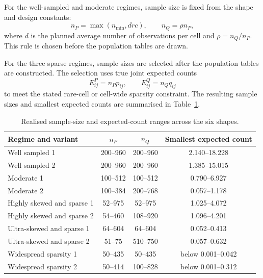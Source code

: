 For the well-sampled and moderate regimes, sample size is fixed from the shape
and design constants:
\begin{equation}
  n_P=\max(n_{\min},drc),
  \qquad
  n_Q=\rho n_P,
  \label{eq:fixed-density-n}
\end{equation}
where \(d\) is the planned average number of observations per cell and
\(\rho=n_Q/n_P\). This rule is chosen before the population tables are drawn.

For the three sparse regimes, sample sizes are selected after the population
tables are constructed. The selection uses true joint expected counts
\begin{equation}
  E^{P}_{ij}=n_Pp_{ij},
  \qquad
  E^{Q}_{ij}=n_Qq_{ij}
  \label{eq:true-expected-counts}
\end{equation}
to meet the stated rare-cell or cell-wide sparsity constraint. The resulting
sample sizes and smallest expected counts are summarised in
Table~\ref{tab:realized-designs}.

\begin{table}[htbp]
\centering
\caption{Realised sample-size and expected-count ranges across the six shapes.}
\label{tab:realized-designs}
\small
\begin{tabularx}{\textwidth}{@{}Xccc@{}}
\toprule
Regime and variant & \(n_P\) & \(n_Q\) & Smallest expected count \\
\midrule
Well sampled 1 & 200--960 & 200--960 & 2.140--18.228 \\
Well sampled 2 & 200--960 & 200--960 & 1.385--15.015 \\
Moderate 1 & 100--512 & 100--512 & 0.790--6.927 \\
Moderate 2 & 100--384 & 200--768 & 0.057--1.178 \\
Highly skewed and sparse 1 & 52--975 & 52--975 & 1.025--4.072 \\
Highly skewed and sparse 2 & 54--460 & 108--920 & 1.096--4.201 \\
Ultra-skewed and sparse 1 & 64--604 & 64--604 & 0.052--0.413 \\
Ultra-skewed and sparse 2 & 51--75 & 510--750 & 0.057--0.632 \\
Widespread sparsity 1 & 50--435 & 50--435 & below 0.001--0.042 \\
Widespread sparsity 2 & 50--414 & 100--828 & below 0.001--0.312 \\
\bottomrule
\end{tabularx}
\end{table}

